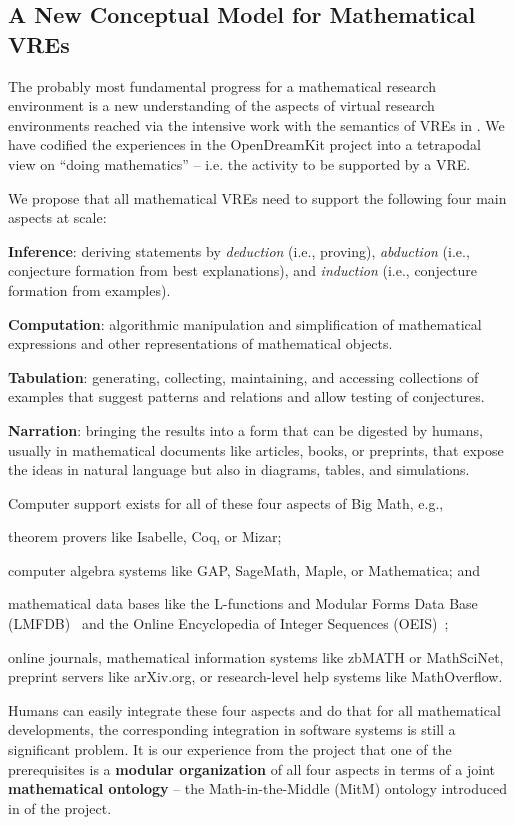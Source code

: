 \subsection{A New Conceptual Model for Mathematical VREs}\label{sec:tetrapod}
The probably most fundamental progress for a mathematical research environment is a new understanding of the aspects of virtual research environments reached via the intensive work with the semantics of VREs in .  We have codified the experiences in the OpenDreamKit project into a tetrapodal view on ``doing
mathematics'' -- i.e. the activity to be supported by a VRE.

We propose that all mathematical VREs need to support the following four main aspects at scale:
\begin{compactenum}[\em i\rm)]
\item \textbf{Inference}: deriving statements by \emph{deduction} (i.e.,
  proving), \emph{abduction} (i.e., conjecture formation from best
  explanations), and \emph{induction} (i.e., conjecture formation from examples).
\item \textbf{Computation}: algorithmic manipulation and simplification
  of mathematical expressions and other representations of
  mathematical objects.
\item \textbf{Tabulation}: generating, collecting, maintaining, and accessing
  collections of examples that suggest patterns and relations and allow testing
  of conjectures. 
\item \textbf{Narration}: bringing the results into a form that can be digested by humans,
  usually in mathematical documents like articles, books, or preprints, that expose the
  ideas in natural language but also in diagrams, tables, and simulations.
\end{compactenum} 
Computer support exists for all of these four aspects of Big Math, e.g.,
\begin{compactenum}[\em i\rm)]
\item theorem provers like Isabelle, Coq, or Mizar;
\item computer algebra systems like GAP, SageMath, Maple, or Mathematica; and
\item mathematical data bases like the L-functions and Modular Forms Data 
Base (LMFDB)~\cite{Cremona:LMFDB16,lmfdb:on} and the Online Encyclopedia of
Integer Sequences (OEIS)~\cite{Sloane:OEIS};
\item online journals, mathematical information systems like zbMATH or MathSciNet,
  preprint servers like arXiv.org, or research-level help systems like MathOverflow.
\end{compactenum}
Humans can easily integrate these four aspects and do that for all mathematical developments, the corresponding integration in software systems is still a significant problem. It is our experience from the \pn project that one of the prerequisites is a \textbf{modular organization} of all four aspects in terms of a joint \textbf{mathematical ontology} -- the Math-in-the-Middle (MitM) ontology introduced in  of the \pn project.

